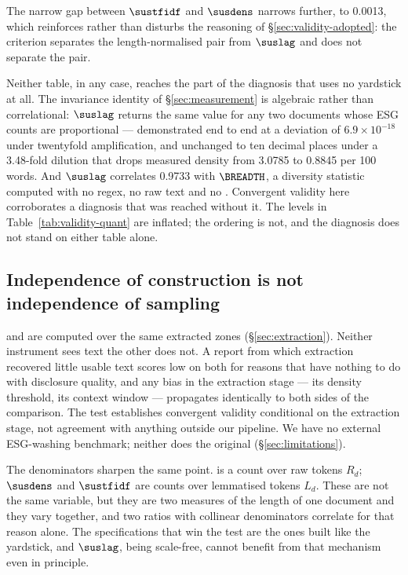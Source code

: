 The narrow gap between $\sustfidf$ and $\susdens$ narrows further, to 0.0013, which
reinforces rather than disturbs the reasoning of \S\ref{sec:validity-adopted}: the criterion
separates the length-normalised pair from $\suslag$ and does not separate the pair.

Neither table, in any case, reaches the part of the diagnosis that uses no yardstick at all.
The invariance identity of \S\ref{sec:measurement} is algebraic rather than correlational:
$\suslag$ returns the same value for any two documents whose ESG counts are proportional ---
demonstrated end to end at a deviation of $6.9 \times 10^{-18}$ under twentyfold
amplification, and unchanged to ten decimal places under a 3.48-fold dilution that drops
measured density from 3.0785 to 0.8845 per 100 words. And $\suslag$ correlates 0.9733 with
$\BREADTH$, a diversity statistic computed with no regex, no raw text and no \QUANT{}.
Convergent validity here corroborates a diagnosis that was reached without it. The levels in
Table~\ref{tab:validity-quant} are inflated; the ordering is not, and the diagnosis does not
stand on either table alone.

\subsection{Independence of construction is not independence of sampling}

\QUANT{} and \SUS{} are computed over the same extracted zones (\S\ref{sec:extraction}).
Neither instrument sees text the other does not. A report from which extraction recovered
little usable text scores low on both for reasons that have nothing to do with disclosure
quality, and any bias in the extraction stage --- its density threshold, its context window
--- propagates identically to both sides of the comparison. The test establishes convergent
validity conditional on the extraction stage, not agreement with anything outside our
pipeline. We have no external ESG-washing benchmark; neither does the original
(\S\ref{sec:limitations}).

The denominators sharpen the same point. \QUANT{} is a count over raw tokens $R_d$;
$\susdens$ and $\sustfidf$ are counts over lemmatised tokens $L_d$. These are not the same
variable, but they are two measures of the length of one document and they vary together,
and two ratios with collinear denominators correlate for that reason alone. The
specifications that win the test are the ones built like the yardstick, and $\suslag$, being
scale-free, cannot benefit from that mechanism even in principle.

